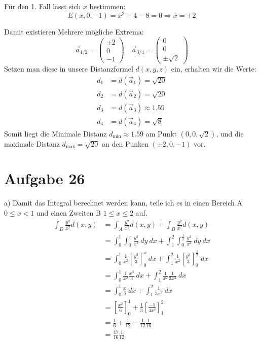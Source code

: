 \documentclass[10pt]{article}
\newcommand{\secondpage}{
	\newpage 
	\setlength{\headheight}{0cm}
}
\begin{document}
\secondpage

Für den 1. Fall lässt sich $x$ bestimmen:
\[ E(x,0,-1) = x^2 + 4 - 8 = 0 \Rightarrow x = \pm 2 \]

Damit existieren Mehrere mögliche Extrema:
\[
	\vec a_{1/2} = \begin{pmatrix} \pm 2 \\ 0 \\ -1 \end{pmatrix} \quad
	\vec a_{3/4} = \begin{pmatrix} 0 \\ 0 \\ \pm \sqrt 2 \end{pmatrix}
\]
Setzen man diese in unsere Distanzformel $d(x,y,z)$ ein, erhalten wir die Werte:
\begin{align*}
	d_1 &= d(\vec a_1) = \sqrt{20} \\
	d_2 &= d(\vec a_2) = \sqrt{20} \\
	d_3 &= d(\vec a_3) \approx 1.59 \\
	d_4 &= d(\vec a_4) = \sqrt{8}
\end{align*}
Somit liegt die Minimale Distanz $d_\text{min} \approx 1.59$ am 
Punkt $(0,0,\sqrt 2)$, und die maximale Distanz $d_\text{max} = \sqrt{20}$ an den
Punken $(\pm2, 0, -1)$ vor.


\section*{Aufgabe 26}
a) Damit das Integral berechnet werden kann, teile ich es in einen Bereich A $0 \leq x < 1$ und einen Zweiten
B $1 \leq x \leq 2$ auf.
\begin{align*}
	\int_D \frac{y^2}{x^2} d(x,y) 
	&= \int_A \frac{y^2}{x^2} d(x,y) +\int_B \frac{y^2}{x^2} d(x,y) \\
	&= \int_0^1 \int_0^x \frac{y^2}{x^2} \ dy \ dx
	+ \int_1^2 \int_0^{\frac1x} \frac{y^2}{x^2} \ dy \ dx \\
	&= \int_0^1 \frac1{x^2} \left[ \frac{y^3}{3} \right]_0^x \ dx
	+ \int_1^2 \frac1{x^2} 
	\left[ \frac{y^3}{3} \right]_0^{\frac1x} \ dx \\
	&= \int_0^1 \frac1{x^2}\frac{x^3}{3} \ dx
	+ \int_1^2 \frac1{x^2} 
	\frac{1}{3x^3} \ dx \\
	&= \int_0^1 \frac x3 \ dx
	+ \int_1^2 \frac{1}{3x^5} \ dx \\
	&= \left[ \frac{x^2}{6} \right]_0^1
	+ \frac13 \left[ \frac{-1}{4x^4} \right]_1^2 \\
	&= \frac16 + \frac 1{12} - \frac{1}{12} \frac1{16} \\
	&= \frac{47}{16} \frac{1}{12}
\end{align*}
\end{document}
